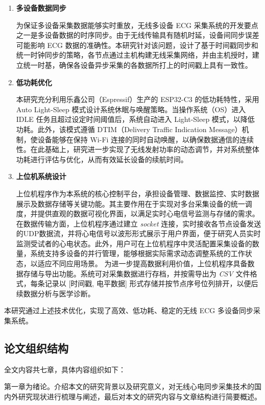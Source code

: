 \begin{enumerate}
    \item \textbf{多设备数据同步}  
    
    为保证多设备采集数据能够实时重放，无线多设备 ECG 采集系统的开发要点之一是多设备数据的时序同步。由于无线传输具有随机时延，设备间同步误差可能影响 ECG 数据的准确性。本研究针对该问题，设计了基于时间戳同步和统一时钟同步的策略，各节点通过主机构建无线采集网络，并由主机授时，建立统一时基，确保各设备异步采集的各数据所打上的时间戳上具有一致性。

    \item \textbf{低功耗优化}  
    
    本研究充分利用乐鑫公司（Espressif）生产的 ESP32-C3 的低功耗特性，采用 Auto Light-Sleep 模式设计系统休眠与唤醒策略。当操作系统（OS）进入 IDLE 任务且超过设定时间阈值后，系统自动进入 Light-Sleep 模式，以降低功耗。此外，该模式遵循 DTIM（Delivery Traffic Indication Message）机制，使设备能够在保持 Wi-Fi 连接的同时自动唤醒，以确保数据通信的连续性。在此基础上，研究进一步实现了无线发射功率的动态调节，并对系统整体功耗进行评估与优化，从而有效延长设备的续航时间。

    \item \textbf{上位机系统设计}  
    
    上位机程序作为本系统的核心控制平台，承担设备管理、数据监控、实时数据展示及数据存储等关键功能。其主要作用在于实现对多台采集设备的统一调度，并提供直观的数据可视化界面，以满足实时心电信号监测与存储的需求。
    在数据传输方面，上位机程序通过建立 \textit{socket} 连接，实时接收各节点设备发送的UDP数据流，并将心电信号以波形形式展示于用户界面，便于研究人员实时监测受试者的心电状态。此外，用户可在上位机程序中灵活配置采集设备的数量，系统支持多设备的并行管理，能够根据实际需求动态调整系统的工作状态，以适应不同应用场景。
    为进一步提高数据利用价值，上位机程序具备数据存储与导出功能。系统可对采集数据进行存档，并按需导出为 \textit{CSV} 文件格式，每条记录以 [时间戳, 电平数据] 形式存储并按节点序号位列排开，以便后续数据分析与医学诊断。
    
\end{enumerate}
本研究通过上述技术优化，实现了高效、低功耗、稳定的无线 ECG 多设备同步采集系统。

\subsection{论文组织结构}

全文内容共七章，具体内容组织如下：

第一章为绪论。介绍本文的研究背景以及研究意义，对无线心电同步采集技术的国内外研究现状进行梳理与阐述，最后对本文的研究内容与文章结构进行简要概述。

